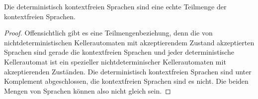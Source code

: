 \begin{Satz}
Die deterministisch kontextfreien Sprachen sind eine echte Teilmenge der kontextfreien Sprachen.
\end{Satz}

\begin{proof}
 Offensichtlich gibt es eine Teilmengenbeziehung, denn die von nichtdeterministischen Kellerautomaten mit akzeptierendem Zustand akzeptierten Sprachen sind gerade die kontextfreien Sprachen und jeder deterministische Kellerautomat ist ein spezieller nichtdeterminischer Kellerautomaten mit akzeptierenden Zuständen.
 Die deterministisch kontextfreien Sprachen sind unter Komplement abgeschlossen, die kontextfreien Sprachen sind es nicht.
 Die beiden Mengen von Sprachen können also nicht gleich sein.
\end{proof}



